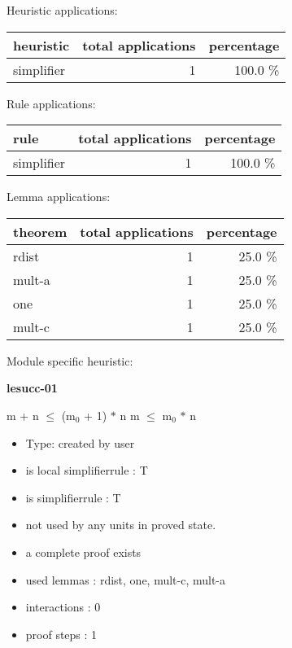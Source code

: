 \documentclass[a4paper]{article}
\begin{document}
\medskip


Heuristic applications:

\begin{supertabular}{l|r|r}
heuristic	& total applications & percentage \\ \hline
simplifier & 1 & 100.0 \% \\

\end{supertabular}

Rule applications:

\begin{supertabular}{l|r|r}
rule	        & total applications & percentage \\ \hline
simplifier & 1 & 100.0 \% \\

\end{supertabular}

Lemma applications:

\begin{supertabular}{l|r|r}
theorem	        & total applications & percentage \\ \hline
rdist & 1 & 25.0 \% \\
mult-a & 1 & 25.0 \% \\
one & 1 & 25.0 \% \\
mult-c & 1 & 25.0 \% \\

\end{supertabular}

Module specific heuristic:

\pagebreak

{\LARGE\bf lesucc-01}\label{lemma-lesucc-01}

\medskip

 \Fol m + n $\le$ ($\mbox{m}_{0}$ + 1) $*$ n \Equiv m $\le$ $\mbox{m}_{0}$ $*$ n

\begin{itemize}

\item Type: created by user

\item is local simplifierrule : T
\item is simplifierrule : T
\item not used by any units in proved state.
\item       a complete proof exists
\item       used lemmas  : rdist, one, mult-c, mult-a
\item       interactions : 0
\item       proof steps  : 1
\end{itemize}
\end{document}
